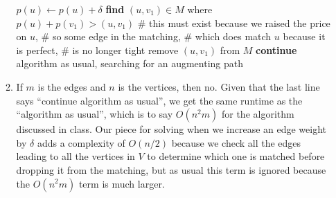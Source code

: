 \documentclass[a4paper]{article}
\begin{document}
\begin{enumerate}
\begin{enumerate}
	\begin{algorithmic}
	\State $p(u) \gets p(u) + \delta$
		\Return
	\Else
		\State \textbf{find} $(u, v_1) \in M$ where $p(u) + p(v_1) > (u, v_1)$
		\State \# this must exist because we raised the price on $u$,
		\State \# so some edge in the matching,
		\State \# which does match $u$ because it is perfect,
		\State \# is no longer tight
		\State remove $(u, v_1)$ from $M$
		\State \textbf{continue} algorithm as usual, searching for an augmenting path
	\EndIf
	\end{algorithmic}
	\item If $m$ is the edges and $n$ is the vertices, then no.  Given that the last line says ``continue algorithm as usual'', we get the same runtime as the ``algorithm as usual'', which is to say $O(n^2 m)$ for the algorithm discussed in class.  Our piece for solving when we increase an edge weight by $\delta$ adds a complexity of $O(n/2)$ because we check all the edges leading to all the vertices in $V$ to determine which one is matched before dropping it from the matching, but as usual this term is ignored because the $O(n^2 m)$ term is much larger.
	\end{enumerate}
\end{enumerate}
\end{document}
